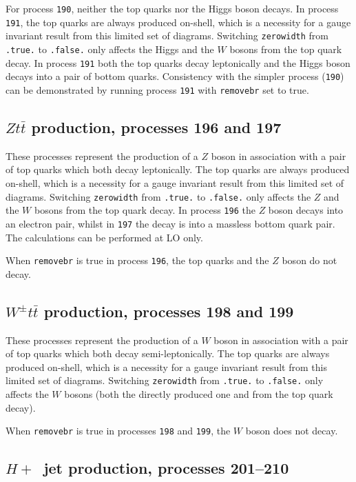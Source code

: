 \documentclass[12pt]{article}
\begin{document}
For process {\tt 190}, neither the top quarks nor the Higgs boson
decays. In process {\tt 191}, the top quarks are always
produced on-shell, which is a necessity for a gauge invariant result
from this limited set of diagrams.
Switching {\tt zerowidth} from {\tt .true.} to {\tt .false.} only affects
the Higgs and the $W$ bosons from the top quark decay.
In process {\tt 191} both the top quarks decay leptonically
and the Higgs boson decays into a pair of bottom quarks. 
Consistency with
the simpler process ({\tt 190}) can be demonstrated by running process
{\tt 191} with {\tt removebr} set to true.

\subsection{$Zt{\bar t}$ production, processes 196 and 197}
\label{subsec:ztt}

These processes represent the production of a $Z$ boson in association
with a pair of top quarks which both decay leptonically.
The top quarks are always
produced on-shell, which is a necessity for a gauge invariant result
from this limited set of diagrams.
Switching {\tt zerowidth} from {\tt .true.} to {\tt .false.} only affects
the $Z$ and the $W$ bosons from the top quark decay.
In process {\tt 196} the $Z$ boson decays into an electron pair, whilst
in {\tt 197} the decay is into a massless bottom quark pair.
The calculations can be performed at LO only.

When {\tt removebr} is true in process {\tt 196}, the top quarks and the $Z$ boson do not decay.

\subsection{$W^\pm t{\bar t}$ production, processes 198 and 199}
\label{subsec:wtt}

These processes represent the production of a $W$ boson in association
with a pair of top quarks which both decay semi-leptonically.
The top quarks are always
produced on-shell, which is a necessity for a gauge invariant result
from this limited set of diagrams.
Switching {\tt zerowidth} from {\tt .true.} to {\tt .false.} only affects
the $W$ bosons (both the directly produced one and from the top quark decay).


When {\tt removebr} is true in processes {\tt 198} and {\tt 199}, 
the $W$ boson does not decay.

\subsection{$H+$~jet production, processes 201--210}
\label{subsec:hjet}
\end{document}
